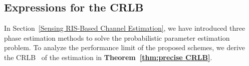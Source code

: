 \documentclass[journal,twocolumn]{IEEEtran}
\theoremstyle{nonumberplain}
\begin{document}
%
%
    
\subsection{Expressions for the CRLB} \label{Precise CRLB}
In Section~\ref{Sensing RIS-Based Channel Estimation}, we have introduced three phase estimation methods to solve the probabilistic parameter estimation problem.
To analyze the performance limit of the proposed schemes, we derive the CRLB~\cite{casella2021statistical} of the estimation in \textbf{Theorem~\ref{thm:precise CRLB}}.
    
\end{document}
